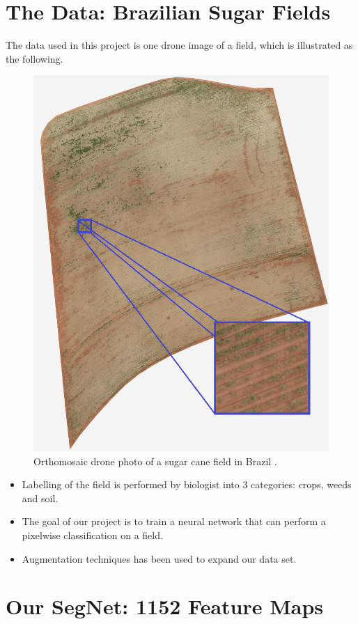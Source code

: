 \documentclass[
    ,title     = {{Image Segmentation for Smart Agriculture}}
    ,subject   = {{This is the subject of my work}}
    ,papersize = {{a1paper}}
    ,nocrop
]{dtuposter}
\begin{document}
\begin{dtupostercontent}
\section{The Data: Brazilian Sugar Fields}
The data used in this project is one drone image of a field, which is illustrated as the following.
\begin{figure}
\centering
\includegraphics[width=.7\linewidth]{raw-min3}
\caption{Orthomosaic drone photo of a sugar cane field in Brazil \cite{USC}.}
\end{figure}
\begin{itemize}
	\item Labelling of the field is performed by biologist into 3 categories: crops, weeds and soil.
	\item The goal of our project is to train a neural network that can perform a pixelwise classification on a field.
	\item Augmentation techniques has been used to expand our data set.
\end{itemize}

\section{Our SegNet: 1152 Feature Maps}




\end{dtupostercontent}
\end{document}
